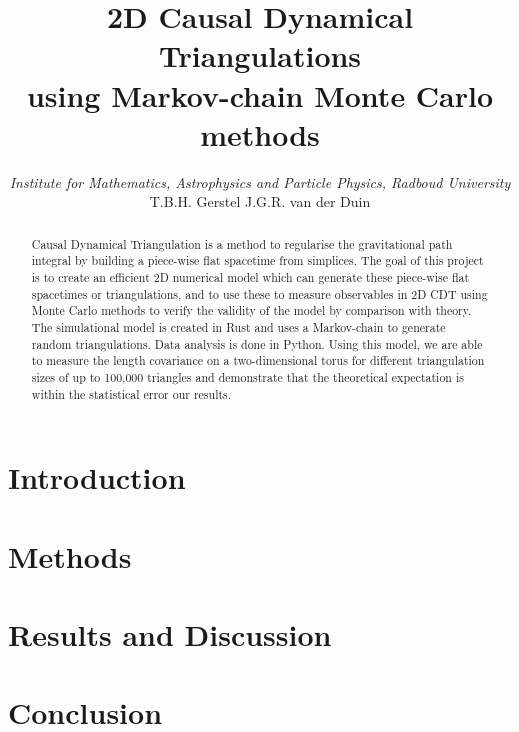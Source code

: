 \documentclass{article}
\title{{\huge 2D Causal Dynamical Triangulations} \\ {\Large using Markov-chain Monte Carlo methods}}
\author{\textit{Institute for Mathematics, Astrophysics and Particle Physics, Radboud University} \\[1mm] T.B.H. Gerstel \hspace{1cm} J.G.R. van der Duin}
\begin{document}
\maketitle

\begin{abstract} %
    Causal Dynamical Triangulation is a method to regularise the gravitational path integral by building a piece-wise flat spacetime from simplices.
    The goal of this project is to create an efficient 2D numerical model which can generate these piece-wise flat spacetimes or triangulations, and to use these to measure observables in 2D CDT using Monte Carlo methods to verify the validity of the model by comparison with theory.
    The simulational model is created in Rust and uses a Markov-chain to generate random triangulations. Data analysis is done in Python.
    Using this model, we are able to measure the length covariance on a two-dimensional torus for different triangulation sizes of up to 100,000 triangles and demonstrate that the theoretical expectation is within the statistical error our results.
\end{abstract}

\newpage

\section{Introduction}


\section{Methods}


\section{Results and Discussion}


\section{Conclusion}


\printbibliography

\appendix
\end{document}
